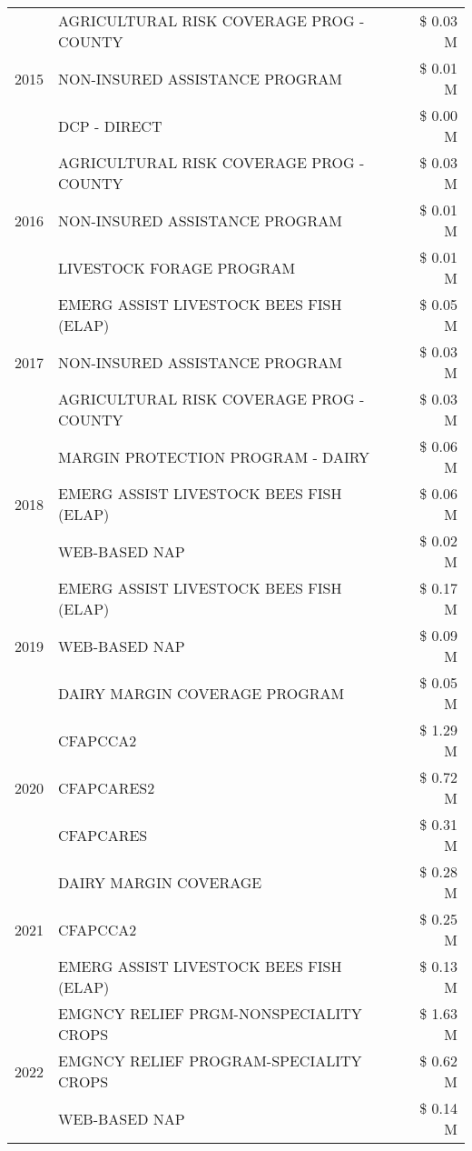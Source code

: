 \begin{tabular}{llr}
\cline{1-3}
\multirow[t]{3}{*}{2015} & AGRICULTURAL RISK COVERAGE PROG - COUNTY & \$ 0.03 M \\
 & NON-INSURED ASSISTANCE PROGRAM & \$ 0.01 M \\
 & DCP - DIRECT & \$ 0.00 M \\
\cline{1-3}
\multirow[t]{3}{*}{2016} & AGRICULTURAL RISK COVERAGE PROG - COUNTY & \$ 0.03 M \\
 & NON-INSURED ASSISTANCE PROGRAM & \$ 0.01 M \\
 & LIVESTOCK FORAGE PROGRAM & \$ 0.01 M \\
\cline{1-3}
\multirow[t]{3}{*}{2017} & EMERG ASSIST LIVESTOCK BEES FISH (ELAP) & \$ 0.05 M \\
 & NON-INSURED ASSISTANCE PROGRAM & \$ 0.03 M \\
 & AGRICULTURAL RISK COVERAGE PROG - COUNTY & \$ 0.03 M \\
\cline{1-3}
\multirow[t]{3}{*}{2018} & MARGIN PROTECTION PROGRAM - DAIRY & \$ 0.06 M \\
 & EMERG ASSIST LIVESTOCK BEES FISH (ELAP) & \$ 0.06 M \\
 & WEB-BASED NAP & \$ 0.02 M \\
\cline{1-3}
\multirow[t]{3}{*}{2019} & EMERG ASSIST LIVESTOCK BEES FISH (ELAP) & \$ 0.17 M \\
 & WEB-BASED NAP & \$ 0.09 M \\
 & DAIRY MARGIN COVERAGE PROGRAM & \$ 0.05 M \\
\cline{1-3}
\multirow[t]{3}{*}{2020} & CFAPCCA2 & \$ 1.29 M \\
 & CFAPCARES2 & \$ 0.72 M \\
 & CFAPCARES & \$ 0.31 M \\
\cline{1-3}
\multirow[t]{3}{*}{2021} & DAIRY MARGIN COVERAGE & \$ 0.28 M \\
 & CFAPCCA2 & \$ 0.25 M \\
 & EMERG ASSIST LIVESTOCK BEES FISH (ELAP) & \$ 0.13 M \\
\cline{1-3}
\multirow[t]{3}{*}{2022} & EMGNCY RELIEF PRGM-NONSPECIALITY CROPS & \$ 1.63 M \\
 & EMGNCY RELIEF PROGRAM-SPECIALITY CROPS & \$ 0.62 M \\
 & WEB-BASED NAP & \$ 0.14 M \\
\cline{1-3}
\bottomrule
\end{tabular}
